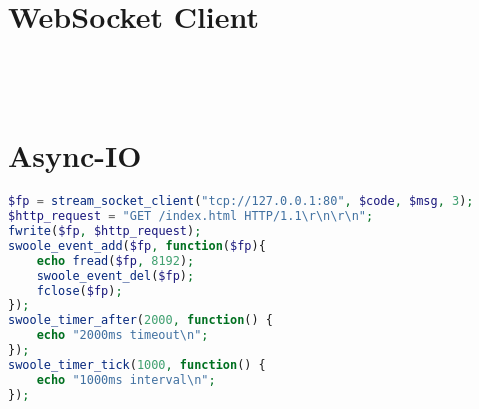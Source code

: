 \begin{lstlisting}[language=PHP]

\end{lstlisting}


\chapter{WebSocket Client}

\begin{lstlisting}[language=PHP]

\end{lstlisting}




\begin{lstlisting}[language=PHP]

\end{lstlisting}




\begin{lstlisting}[language=PHP]

\end{lstlisting}




\begin{lstlisting}[language=PHP]

\end{lstlisting}


\chapter{Async-IO}

\begin{lstlisting}[language=PHP]
$fp = stream_socket_client("tcp://127.0.0.1:80", $code, $msg, 3);
$http_request = "GET /index.html HTTP/1.1\r\n\r\n";
fwrite($fp, $http_request);
swoole_event_add($fp, function($fp){
    echo fread($fp, 8192);
    swoole_event_del($fp);
    fclose($fp);
});
swoole_timer_after(2000, function() {
    echo "2000ms timeout\n";
});
swoole_timer_tick(1000, function() {
    echo "1000ms interval\n";
});
\end{lstlisting}




\begin{lstlisting}[language=PHP]

\end{lstlisting}




\begin{lstlisting}[language=PHP]

\end{lstlisting}


